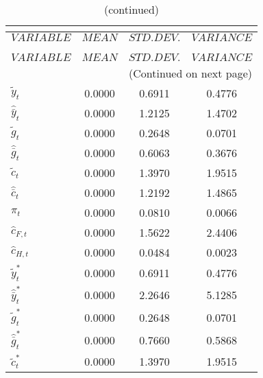  
\begin{center}
\begin{longtable}{lccc} 
\caption{THEORETICAL MOMENTS}\\
 \label{Table:th_moments}\\
\toprule 
$VARIABLE             $	 & 	 $         MEAN$	 & 	 $    STD. DEV.$	 & 	 $     VARIANCE$\\
\midrule \endfirsthead 
\caption{(continued)}\\
 \toprule \\ 
$VARIABLE             $	 & 	 $         MEAN$	 & 	 $    STD. DEV.$	 & 	 $     VARIANCE$\\
\midrule \endhead 
\midrule \multicolumn{4}{r}{(Continued on next page)} \\ \bottomrule \endfoot 
\bottomrule \endlastfoot 
${\tilde y_t}         $	 & 	       0.0000	 & 	       0.6911	 & 	       0.4776 \\ 
${\hat {\bar y}_t}    $	 & 	       0.0000	 & 	       1.2125	 & 	       1.4702 \\ 
${\tilde g_t}         $	 & 	       0.0000	 & 	       0.2648	 & 	       0.0701 \\ 
${\hat {\bar g}_t}    $	 & 	       0.0000	 & 	       0.6063	 & 	       0.3676 \\ 
${\tilde c_t}         $	 & 	       0.0000	 & 	       1.3970	 & 	       1.9515 \\ 
${\hat {\bar c}_t}    $	 & 	       0.0000	 & 	       1.2192	 & 	       1.4865 \\ 
${\pi_t}              $	 & 	       0.0000	 & 	       0.0810	 & 	       0.0066 \\ 
${\hat c_{F,t}}       $	 & 	       0.0000	 & 	       1.5622	 & 	       2.4406 \\ 
${\hat c_{H,t}}       $	 & 	       0.0000	 & 	       0.0484	 & 	       0.0023 \\ 
${\tilde y_t^*}       $	 & 	       0.0000	 & 	       0.6911	 & 	       0.4776 \\ 
${\hat {\bar y}_t^*}  $	 & 	       0.0000	 & 	       2.2646	 & 	       5.1285 \\ 
${\tilde g_t^*}       $	 & 	       0.0000	 & 	       0.2648	 & 	       0.0701 \\ 
${\hat {\bar g}_t^*}  $	 & 	       0.0000	 & 	       0.7660	 & 	       0.5868 \\ 
${\tilde c_t^*}       $	 & 	       0.0000	 & 	       1.3970	 & 	       1.9515 \\ 

\end{longtable}
\end{center}

